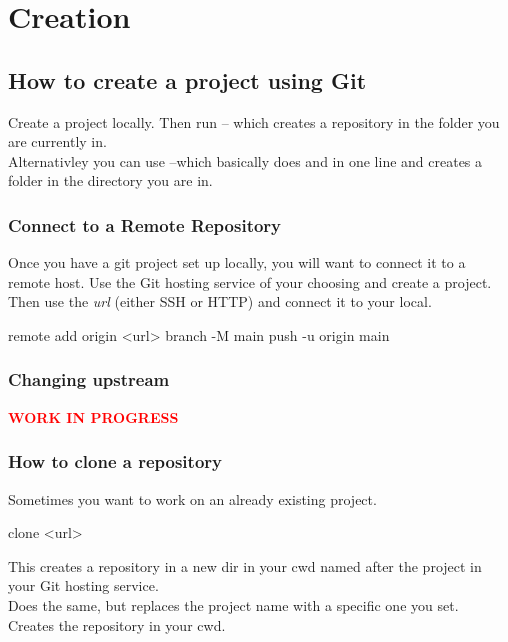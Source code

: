 \chapter{Creation}
\chapteroverlay
\section{How to create a project using Git}
Create a project locally. Then run  -- which creates a repository in the folder you are currently in.\\
Alternativley you can use   --which basically does  and  in one line and creates a folder in the directory you are in.\\

\subsection{Connect to a Remote Repository}
Once you have a git project set up locally, you will want to connect it to a remote host. Use the Git hosting service of your choosing and create a project. Then use the \textit{url} (either SSH or HTTP) and connect it to your local.
\begin{gitBashBox}
remote add origin <url>
branch -M main
push -u origin main
\end{gitBashBox}

\subsection{Changing upstream}
\textbf{\textcolor{red}{WORK IN PROGRESS}}

\subsection{How to clone a repository}
Sometimes you want to work on an already existing project. 
\begin{gitBashBox}
clone <url>
\end{gitBashBox}
This creates a repository in a new dir in your cwd named after the project in your Git hosting service.\\
\noindent{}
Does the same, but replaces the project name with a specific one you set.\\
\noindent{}
Creates the repository in your cwd.